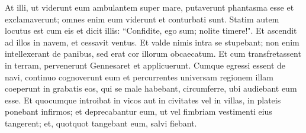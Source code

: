 \begin{biblechapter}
\verse At illi, ut viderunt eum ambulantem super mare, putaverunt phantasma esse et exclamaverunt; 
\verse omnes enim eum viderunt et conturbati sunt. Statim autem locutus est cum eis et dicit illis: “Confidite, ego sum; nolite timere!". 
\verse Et ascendit ad illos in navem, et cessavit ventus. Et valde nimis intra se stupebant; 
\verse non enim intellexerant de panibus, sed erat cor illorum obcaecatum. 
\verse Et cum transfretassent in terram, pervenerunt Gennesaret et applicuerunt.  
\verse Cumque egressi essent de navi, continuo cognoverunt eum 
\verse et percurrentes universam regionem illam coeperunt in grabatis eos, qui se male habebant, circumferre, ubi audiebant eum esse. 
\verse Et quocumque introibat in vicos aut in civitates vel in villas, in plateis ponebant infirmos; et deprecabantur eum, ut vel fimbriam vestimenti eius tangerent; et, quotquot tangebant eum, salvi fiebant. 
\end{biblechapter}

